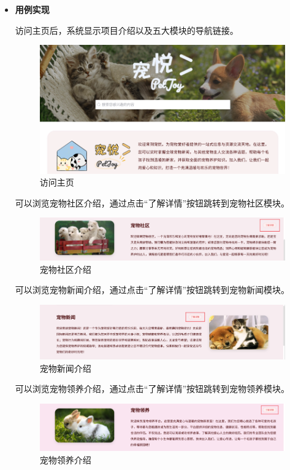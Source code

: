 \begin{itemize}
	\item \textbf{用例实现}

	访问主页后，系统显示项目介绍以及五大模块的导航链接。

	\begin{figure}[H]
		\centering
		\includegraphics[scale=0.8]{figures/HomepageBasicFunctions3.png} 
		\caption{访问主页}
	\end{figure}

	可以浏览宠物社区介绍，通过点击“了解详情”按钮跳转到宠物社区模块。

	\begin{figure}[H]
		\centering
		\includegraphics[scale=0.8]{figures/HomepageBasicFunctions4.png} 
		\caption{宠物社区介绍}
	\end{figure}

	可以浏览宠物新闻介绍，通过点击“了解详情”按钮跳转到宠物新闻模块。

	\begin{figure}[H]
		\centering
		\includegraphics[scale=0.8]{figures/HomepageBasicFunctions5.png} 
		\caption{宠物新闻介绍}
	\end{figure}

	可以浏览宠物领养介绍，通过点击“了解详情”按钮跳转到宠物领养模块。

	\begin{figure}[H]
		\centering
		\includegraphics[scale=0.8]{figures/HomepageBasicFunctions6.png} 
		\caption{宠物领养介绍}
	\end{figure}


\end{itemize}
